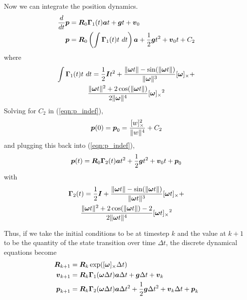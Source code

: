 Now we can integrate the position dynamics.
\begin{align}
    \frac{d}{dt}\mat{p} &= \mat{R}_0\mat{\Gamma}_1(t)\mat{a}t + \mat{g}t + \mat{v}_0 \\
    \mat{p} &= \mat{R}_0 \left(\int \mat{\Gamma}_1(t)t\ dt\right)\mat{a} + \frac{1}{2}\mat{g}t^2 + \mat{v}_0t + C_2 \label{eqn:p_indef}
\end{align}
where
\begin{multline}
    \int \boldsymbol{\Gamma}_1(t)t\ dt =
    \frac{1}{2}\boldsymbol{I}t^2 + \frac{\Vert\boldsymbol{\omega} t\Vert - \sin(\Vert\boldsymbol{\omega} t\Vert)}{\Vert\boldsymbol{\omega}\Vert^3}[\boldsymbol{\omega}]_\times +\\ \frac{\Vert\boldsymbol{\omega} t\Vert^2 + 2\cos(\Vert\boldsymbol{\omega} t\Vert)}{2\Vert\boldsymbol{\omega}\Vert^4}[\boldsymbol{\omega} ]_\times{}^2
\end{multline}
Solving for $C_2$ in (\ref{eqn:p_indef}),
\begin{align}
    \boldsymbol{p}(0) = \boldsymbol{p}_0 = \frac{[w]_\times^2}{\Vert w\Vert^4}+C_2
\end{align}
and plugging this back into (\ref{eqn:p_indef}),
\begin{align}
    \boldsymbol{p}(t) = \boldsymbol{R}_0\boldsymbol{\Gamma}_2(t)\boldsymbol{a}t^2 + \frac{1}{2}\boldsymbol{g}t^2 + \boldsymbol{v}_0t + \boldsymbol{p}_0
\end{align}
with
\begin{multline}
    \boldsymbol{\Gamma}_2(t) = \frac{1}{2}\boldsymbol{I} + \frac{\Vert\boldsymbol{\omega} t\Vert - \sin(\Vert\boldsymbol{\omega} t\Vert)}{\Vert\boldsymbol{\omega} t\Vert^3}[\boldsymbol{\omega} t]_\times +\\ \frac{\Vert\boldsymbol{\omega} t\Vert^2 + 2\cos(\Vert\boldsymbol{\omega} t\Vert) - 2}{2\Vert\boldsymbol{\omega} t\Vert^4}[\boldsymbol{\omega} t]_\times{}^2
\end{multline}

Thus, if we take the initial conditions to be at timestep $k$ and the value at $k+1$ to be the quantity of the state transition over time $\Delta t$, the discrete dynamical equations become
\begin{align}
    \boldsymbol{R}_{k+1} &= \boldsymbol{R}_{k}\exp([\boldsymbol{\omega}]_\times \Delta t) \\
    \boldsymbol{v}_{k+1} &= \boldsymbol{R}_k \boldsymbol{\Gamma}_1(\boldsymbol{\omega} \Delta t) \boldsymbol{a} \Delta t + \boldsymbol{g} \Delta t + \boldsymbol{v}_k \\
    \boldsymbol{p}_{k+1} &= \boldsymbol{R}_k \boldsymbol{\Gamma}_2(\boldsymbol{\omega} \Delta t) \boldsymbol{a} \Delta t^2 + \frac{1}{2}\boldsymbol{g}  \Delta t^2 + \boldsymbol{v}_k \Delta t + \boldsymbol{p}_k
\end{align}